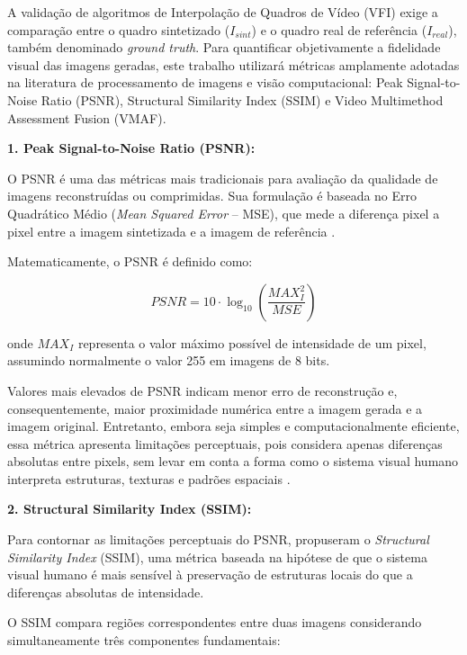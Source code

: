 \documentclass[
    12pt,                %
    openright,           %
    oneside,             %
    a4paper,             %
    english,             %
    brazil               %
]{abntex2}
\begin{document}
A validação de algoritmos de Interpolação de Quadros de Vídeo (VFI) exige a comparação entre o quadro sintetizado ($I_{sint}$) e o quadro real de referência ($I_{real}$), também denominado \textit{ground truth}. Para quantificar objetivamente a fidelidade visual das imagens geradas, este trabalho utilizará métricas amplamente adotadas na literatura de processamento de imagens e visão computacional: Peak Signal-to-Noise Ratio (PSNR), Structural Similarity Index (SSIM) e Video Multimethod Assessment Fusion (VMAF).

\textbf{1. Peak Signal-to-Noise Ratio (PSNR):}

O PSNR é uma das métricas mais tradicionais para avaliação da qualidade de imagens reconstruídas ou comprimidas. Sua formulação é baseada no Erro Quadrático Médio (\textit{Mean Squared Error} -- MSE), que mede a diferença pixel a pixel entre a imagem sintetizada e a imagem de referência \cite{Hore2010}.

Matematicamente, o PSNR é definido como:

\begin{equation}
    PSNR = 10 \cdot \log_{10}
    \left(
    \frac{MAX_I^2}{MSE}
    \right)
\end{equation}

onde $MAX_I$ representa o valor máximo possível de intensidade de um pixel, assumindo normalmente o valor 255 em imagens de 8 bits.

Valores mais elevados de PSNR indicam menor erro de reconstrução e, consequentemente, maior proximidade numérica entre a imagem gerada e a imagem original. Entretanto, embora seja simples e computacionalmente eficiente, essa métrica apresenta limitações perceptuais, pois considera apenas diferenças absolutas entre pixels, sem levar em conta a forma como o sistema visual humano interpreta estruturas, texturas e padrões espaciais \cite{Hore2010}.

\vspace{0.3cm}

\textbf{2. Structural Similarity Index (SSIM):}

Para contornar as limitações perceptuais do PSNR,  propuseram o \textit{Structural Similarity Index} (SSIM), uma métrica baseada na hipótese de que o sistema visual humano é mais sensível à preservação de estruturas locais do que a diferenças absolutas de intensidade.

O SSIM compara regiões correspondentes entre duas imagens considerando simultaneamente três componentes fundamentais:
\end{document}
